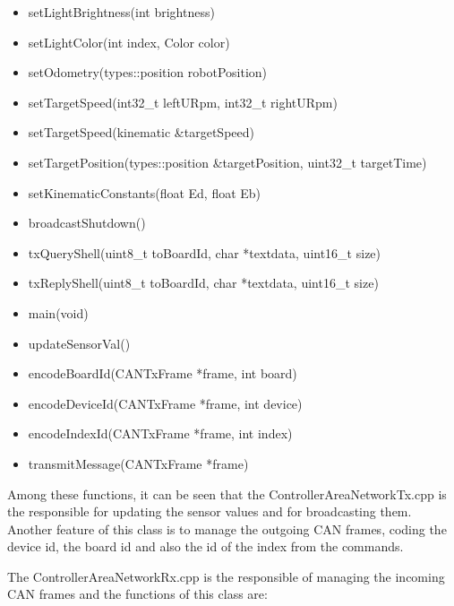 \documentclass[12pt]{report}%
\begin{document}
\begin{itemize}
\item setLightBrightness(int brightness)
\item setLightColor(int index, Color color)
\item setOdometry(types::position robotPosition)
\item setTargetSpeed(int32\_t leftURpm, int32\_t rightURpm)
\item setTargetSpeed(kinematic \&targetSpeed)
\item setTargetPosition(types::position \&targetPosition, uint32\_t targetTime)
\item setKinematicConstants(float Ed, float Eb)
\item broadcastShutdown()
\item txQueryShell(uint8\_t toBoardId, char *textdata, uint16\_t size)
\item txReplyShell(uint8\_t toBoardId, char *textdata, uint16\_t size)
\item main(void)
\item updateSensorVal()
\item encodeBoardId(CANTxFrame *frame, int board)
\item encodeDeviceId(CANTxFrame *frame, int device)
\item encodeIndexId(CANTxFrame *frame, int index)
\item transmitMessage(CANTxFrame *frame)
\end{itemize}

Among these functions, it can be seen that the ControllerAreaNetworkTx.cpp is the responsible for updating the sensor values and for broadcasting them. Another feature of this class is to manage the outgoing CAN frames, coding the device id, the board id and also the id of the index from the commands.

The ControllerAreaNetworkRx.cpp is the responsible of managing the incoming CAN frames and the functions of this class are:
\end{document}
